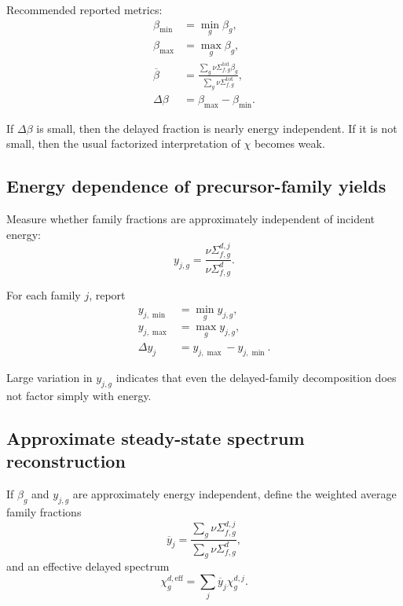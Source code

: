 \documentclass[11pt]{article}
\begin{document}
Recommended reported metrics:
\begin{align}
  \beta_{\min} &= \min_g \beta_g, \\
  \beta_{\max} &= \max_g \beta_g, \\
  \overline{\beta} &= \frac{\sum_g \nu \Sigma_{f,g}^{\mathrm{tot}} \beta_g}
                           {\sum_g \nu \Sigma_{f,g}^{\mathrm{tot}}}, \\
  \Delta \beta &= \beta_{\max} - \beta_{\min}.
\end{align}

If \(\Delta \beta\) is small, then the delayed fraction is nearly energy independent.
If it is not small, then the usual factorized interpretation of \(\chi\) becomes weak.

\subsection{Energy dependence of precursor-family yields}

Measure whether family fractions are approximately independent of incident energy:
\begin{equation}
  y_{j,g} = \frac{\nu \Sigma_{f,g}^{d,j}}{\nu \Sigma_{f,g}^{d}}.
\end{equation}

For each family \(j\), report
\begin{align}
  y_{j,\min} &= \min_g y_{j,g}, \\
  y_{j,\max} &= \max_g y_{j,g}, \\
  \Delta y_j &= y_{j,\max} - y_{j,\min}.
\end{align}

Large variation in \(y_{j,g}\) indicates that even the delayed-family decomposition does
not factor simply with energy.

\subsection{Approximate steady-state spectrum reconstruction}

If \(\beta_g\) and \(y_{j,g}\) are approximately energy independent, define the weighted
average family fractions
\begin{equation}
  \overline{y}_j =
  \frac{\sum_g \nu \Sigma_{f,g}^{d,j}}
       {\sum_g \nu \Sigma_{f,g}^{d}},
\end{equation}
and an effective delayed spectrum
\begin{equation}
  \chi_g^{d,\mathrm{eff}} = \sum_j \overline{y}_j \chi_g^{d,j}.
\end{equation}
\end{document}
